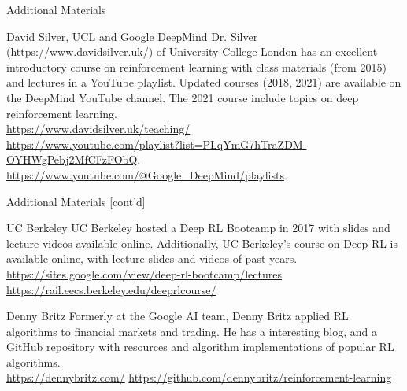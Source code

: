 \documentclass[ignorenonframetext,xcolor=x11names]{beamer}
\begin{document}
\begin{frame}[label=full]{Additional Materials}
\footnotesize
\begin{block}{David Silver, UCL and Google DeepMind}
Dr. Silver (\url{https://www.davidsilver.uk/}) of University College London has an excellent introductory course on reinforcement learning with class materials (from 2015) and lectures in a YouTube playlist. Updated courses (2018, 2021) are available on the DeepMind YouTube channel. The 2021 course include topics on deep reinforcement learning. \\
\vspace{\baselineskip}
\url{https://www.davidsilver.uk/teaching/} \\
\vspace{.5\baselineskip}
\url{https://www.youtube.com/playlist?list=PLqYmG7hTraZDM-OYHWgPebj2MfCFzFObQ}. \\
\vspace{.5\baselineskip}
\url{https://www.youtube.com/@Google_DeepMind/playlists}.
\end{block}
\end{frame}

\begin{frame}[label=full]{Additional Materials \small [cont'd]}
\footnotesize
\begin{block}{UC Berkeley}
UC Berkeley hosted a Deep RL Bootcamp in 2017 with slides and lecture videos available online. Additionally, UC Berkeley's course on Deep RL is available online, with lecture slides and videos of past years.
\vspace{\baselineskip}
\url{https://sites.google.com/view/deep-rl-bootcamp/lectures}
\vspace{\baselineskip}
\url{https://rail.eecs.berkeley.edu/deeprlcourse/}
\end{block}

\begin{block}{Denny Britz}
Formerly at the Google AI team, Denny Britz applied RL algorithms to financial markets and trading. He has a interesting blog, and a GitHub repository with resources and algorithm implementations of popular RL algorithms. \\
\vspace{\baselineskip}
\url{https://dennybritz.com/}
\vspace{\baselineskip}
\url{https://github.com/dennybritz/reinforcement-learning}
\end{block}
\end{frame}
\end{document}
